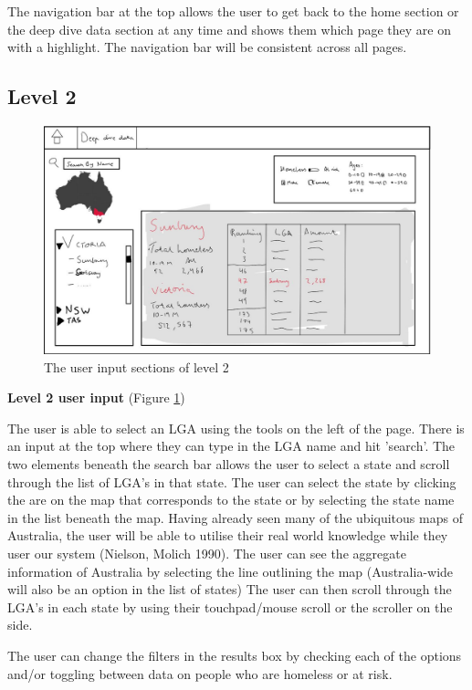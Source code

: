 \documentclass[12pt, a4paper]{article}
\begin{document}
The navigation bar at the top allows the user to get back to the home section or the deep dive data section at any time and shows them which page they are on with a highlight. The navigation bar will be consistent across all pages.

\subsection{Level 2}
\begin{figure}[h]
\centering
\includegraphics[scale=.6]{level2outer.png} 
\caption{The user input sections of level 2}
\label{fig:2outer}
\end{figure}
\textbf{Level 2 user input} (Figure \ref{fig:2outer}) 

The user is able to select an LGA using the tools on the left of the page. There is an input at the top where they can type in the LGA name and hit 'search'. The two elements beneath the search bar allows the user to select a state and scroll through the list of LGA's in that state. The user can select the state by clicking the are on the map that corresponds to the state or by selecting the state name in the list beneath the map. Having already seen many of the ubiquitous maps of Australia, the user will be able to utilise their real world knowledge while they user our system  (Nielson, Molich 1990). The user can see the aggregate information of Australia by selecting the line outlining the map (Australia-wide will also be an option in the list of states) The user can then scroll through the LGA's in each state by using their touchpad/mouse scroll or the scroller on the side. 

The user can change the filters in the results box by checking each of the options and/or toggling between data on people who are homeless or at risk. 
\end{document}
